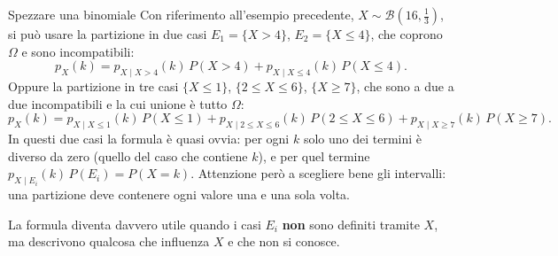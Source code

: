 \begin{esempio}{Spezzare una binomiale}
Con riferimento all'esempio precedente, $X \sim \mathcal{B}(16, \frac13)$, si può usare la partizione in due casi
$E_1 = \{X > 4\}$, $E_2 = \{X \leq 4\}$, che coprono $\Omega$ e sono incompatibili:
\[ p_X(k) = p_{X \mid X > 4}(k)\, P(X > 4) + p_{X \mid X \leq 4}(k)\, P(X \leq 4) . \]
Oppure la partizione in tre casi $\{X \leq 1\}$, $\{2 \leq X \leq 6\}$, $\{X \geq 7\}$, che sono a due a due
incompatibili e la cui unione è tutto $\Omega$:
\[
  p_X(k) = p_{X \mid X \leq 1}(k)\, P(X \leq 1) + p_{X \mid 2 \leq X \leq 6}(k)\, P(2 \leq X \leq 6)
         + p_{X \mid X \geq 7}(k)\, P(X \geq 7) .
\]
In questi due casi la formula è quasi ovvia: per ogni $k$ solo uno dei termini è diverso da zero (quello del caso che
contiene $k$), e per quel termine $p_{X \mid E_i}(k)\, P(E_i) = P(X = k)$. Attenzione però a scegliere bene gli
intervalli: una partizione deve contenere ogni valore una e una sola volta.
\end{esempio}

La formula diventa davvero utile quando i casi $E_i$ \textbf{non} sono definiti tramite $X$, ma descrivono qualcosa
che influenza $X$ e che non si conosce.

